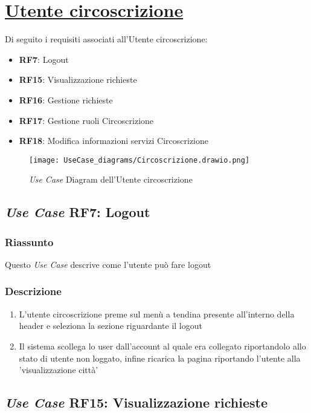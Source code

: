 \section{\underline{Utente circoscrizione}}
    Di seguito i requisiti associati all'Utente circoscrizione:
    \begin{itemize}
        \item \textbf{RF7}: Logout
        \item \textbf{RF15}: Visualizzazione richieste
        \item \textbf{RF16}: Gestione richieste
        \item \textbf{RF17}: Gestione ruoli Circoscrizione
        \item \textbf{RF18}: Modifica informazioni servizi Circoscrizione
    \end{itemize}
    \begin{figure}[H]
        \centering
        \texttt{[image: UseCase\_diagrams/Circoscrizione.drawio.png]}
        \caption{\textit{Use Case} Diagram dell'Utente circoscrizione}
    \end{figure}

    \subsection{\textit{Use Case} RF7: Logout}
        \subsubsection{Riassunto}
            Questo \textit{Use Case} descrive come l'utente può fare logout
        \subsubsection{Descrizione}
            \begin{enumerate}
                \item L'utente circoscrizione preme sul menù a tendina presente all'interno della header e seleziona la sezione riguardante il logout
                \item Il sistema scollega lo user dall'account al quale era collegato riportandolo allo stato di utente non loggato, infine 
                ricarica la pagina riportando l'utente alla 'visualizzazione città'
            \end{enumerate}

    \subsection{\textit{Use Case} RF15: Visualizzazione richieste}
